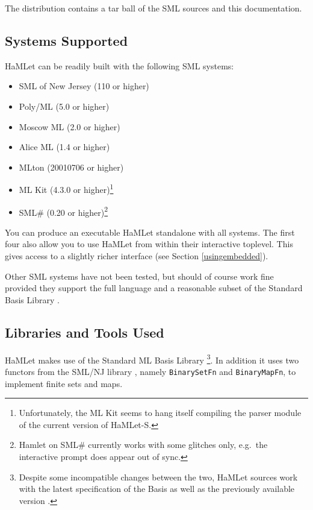 \documentclass[twoside,titlepage]{article}
\begin{document}
The distribution contains a tar ball of the SML sources and this documentation.


\subsection{Systems Supported}
\label{systems}

HaMLet can be readily built with the following SML systems:%

\begin{itemize}
\setlength{\parskip}{0ex}
\item SML of New Jersey (110 or higher) \cite{smlnj}
\item Poly/ML (5.0 or higher) \cite{polyml}
\item Moscow ML (2.0 or higher) \cite{mosml}
\item Alice ML (1.4 or higher) \cite{alice}
\item MLton (20010706 or higher) \cite{mlton}
\item ML Kit (4.3.0 or higher)\footnote{Unfortunately, the ML Kit seems to hang itself compiling the parser module of the current version of HaMLet-S.} \cite{mlkit}
\item SML\# (0.20 or higher)\footnote{Hamlet on SML\# currently works with some glitches only, e.g.\ the interactive prompt does appear out of sync.} \cite{smlsharp}
\end{itemize}

You can produce an executable HaMLet standalone with all systems. The first four also allow you to use HaMLet from within their interactive toplevel. This gives access to a slightly richer interface (see Section \ref{usingembedded}).

Other SML systems have not been tested, but should of course work fine provided they support the full language and a reasonable subset of the Standard Basis Library \cite{basis}.


\subsection{Libraries and Tools Used}
\label{usedtools}

HaMLet makes use of the Standard ML Basis Library \cite{basis}\footnote{Despite some incompatible changes between the two, HaMLet sources work with the latest specification of the Basis \cite{basis} as well as the previously available version \cite{basis-old}.}. In addition it uses two functors from the SML/NJ library \cite{njlib}, namely {\tt BinarySetFn} and {\tt BinaryMapFn}, to implement finite sets and maps.
\end{document}
